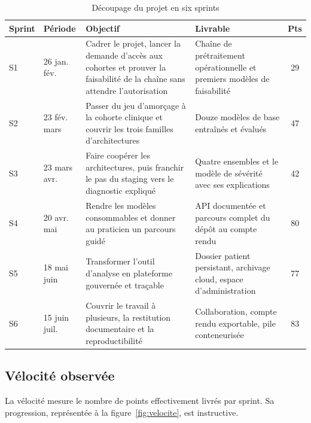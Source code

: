 \begin{table}[H]
\centering
\caption{Découpage du projet en six sprints}
\label{tab:sprints}
\small
\begin{tabular}{@{}L{1.5cm}L{2.5cm}L{5.0cm}L{4.4cm}c@{}}
\toprule
\textbf{Sprint} & \textbf{Période} & \textbf{Objectif} & \textbf{Livrable} &
\textbf{Pts} \\
\midrule
S1 & 26 jan. fév. &
Cadrer le projet, lancer la demande d'accès aux cohortes et prouver la faisabilité de
la chaîne sans attendre l'autorisation &
Chaîne de prétraitement opérationnelle et premiers modèles de faisabilité & 29 \\
\addlinespace[3pt]
S2 & 23 fév. mars &
Passer du jeu d'amorçage à la cohorte clinique et couvrir les trois familles
d'architectures &
Douze modèles de base entraînés et évalués & 47 \\
\addlinespace[3pt]
S3 & 23 mars avr. &
Faire coopérer les architectures, puis franchir le pas du staging vers le diagnostic
expliqué &
Quatre ensembles et le modèle de sévérité avec ses explications & 42 \\
\addlinespace[3pt]
S4 & 20 avr. mai &
Rendre les modèles consommables et donner au praticien un parcours guidé &
API documentée et parcours complet du dépôt au compte rendu & 80 \\
\addlinespace[3pt]
S5 & 18 mai juin &
Transformer l'outil d'analyse en plateforme gouvernée et traçable &
Dossier patient persistant, archivage cloud, espace d'administration & 77 \\
\addlinespace[3pt]
S6 & 15 juin juil. &
Couvrir le travail à plusieurs, la restitution documentaire et la reproductibilité &
Collaboration, compte rendu exportable, pile conteneurisée & 83 \\
\bottomrule
\end{tabular}
\end{table}

\subsection{Vélocité observée}

La vélocité mesure le nombre de points effectivement livrés par sprint. Sa
progression, représentée à la figure~\ref{fig:velocite}, est instructive.

